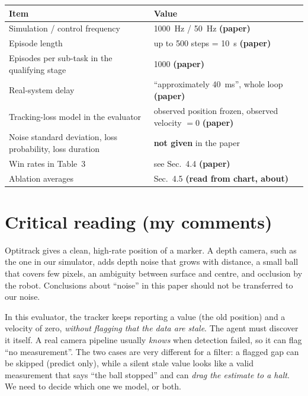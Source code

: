 \documentclass[11pt,a4paper]{article}
\begin{document}
\begin{center}
\small
\begin{tabularx}{\textwidth}{@{}X l@{}}
\toprule
Item & Value \\
\midrule
Simulation / control frequency & 1000~Hz / 50~Hz \textbf{(paper)} \\
Episode length & up to 500 steps = 10~s \textbf{(paper)} \\
Episodes per sub-task in the qualifying stage & 1000 \textbf{(paper)} \\
Real-system delay & ``approximately 40~ms'', whole loop \textbf{(paper)} \\
Tracking-loss model in the evaluator & observed position frozen, observed velocity $=0$ \textbf{(paper)} \\
Noise standard deviation, loss probability, loss duration & \textbf{not given} in the paper \\
Win rates in Table~3 & see Sec.~4.4 \textbf{(paper)} \\
Ablation averages & Sec.~4.5 \textbf{(read from chart, about)} \\
\bottomrule
\end{tabularx}
\end{center}

\section{Critical reading (my comments)}

\begin{warn}
Optitrack gives a clean, high-rate position of a marker. A depth camera, such as the one in our
simulator, adds depth noise that grows with distance, a small ball that covers few pixels, an
ambiguity between surface and centre, and occlusion by the robot. Conclusions about ``noise'' in
this paper should not be transferred to our noise.
\end{warn}

\begin{warn}
In this evaluator, the tracker keeps reporting a value (the old position) and a velocity of zero,
\emph{without flagging that the data are stale}. The agent must discover it itself. A real
camera pipeline usually \emph{knows} when detection failed, so it can flag ``no measurement''.
The two cases are very different for a filter: a flagged gap can be skipped (predict only),
while a silent stale value looks like a valid measurement that says ``the ball stopped'' and can
\emph{drag the estimate to a halt}. We need to decide which one we model, or both.
\end{warn}
\end{document}
